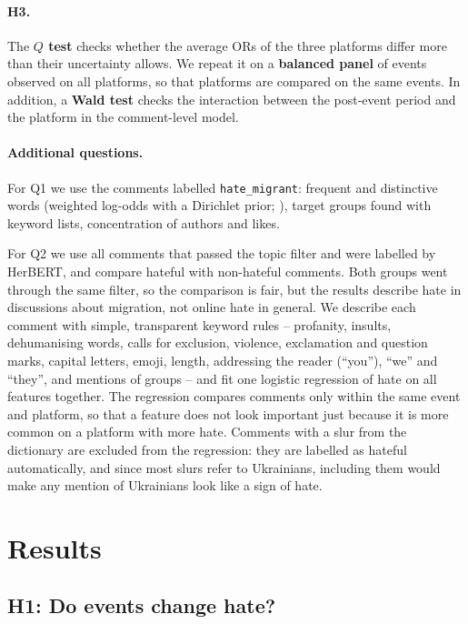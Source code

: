 \documentclass[11pt]{article}
\begin{document}
\paragraph{H3.} The \textbf{$Q$ test} checks whether the average ORs of the three platforms differ more than their uncertainty allows. We repeat it on a \textbf{balanced panel} of events observed on all platforms, so that platforms are compared on the same events. In addition, a \textbf{Wald test} checks the interaction between the post-event period and the platform in the comment-level model.

\paragraph{Additional questions.} For Q1 we use the comments labelled \texttt{hate\_migrant}: frequent and distinctive words (weighted log-odds with a Dirichlet prior; \citealp{monroe2008}), target groups found with keyword lists, concentration of authors and likes.

For Q2 we use all comments that passed the topic filter and were labelled by HerBERT, and compare hateful with non-hateful comments. Both groups went through the same filter, so the comparison is fair, but the results describe hate in discussions about migration, not online hate in general. We describe each comment with simple, transparent keyword rules -- profanity, insults, dehumanising words, calls for exclusion, violence, exclamation and question marks, capital letters, emoji, length, addressing the reader (``you''), ``we'' and ``they'', and mentions of groups -- and fit one logistic regression of hate on all features together. The regression compares comments only within the same event and platform, so that a feature does not look important just because it is more common on a platform with more hate. Comments with a slur from the dictionary are excluded from the regression: they are labelled as hateful automatically, and since most slurs refer to Ukrainians, including them would make any mention of Ukrainians look like a sign of hate.

\section{Results}

\subsection{H1: Do events change hate?}
\end{document}
